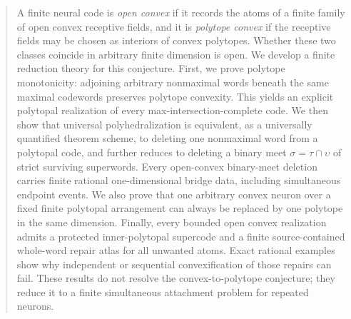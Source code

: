 \begin{abstract}
A finite neural code is \emph{open convex} if it records the atoms of a finite family of open convex receptive fields, and it is \emph{polytope convex} if the receptive fields may be chosen as interiors of convex polytopes.  Whether these two classes coincide in arbitrary finite dimension is open.  We develop a finite reduction theory for this conjecture.  First, we prove polytope monotonicity: adjoining arbitrary nonmaximal words beneath the same maximal codewords preserves polytope convexity.  This yields an explicit polytopal realization of every max-intersection-complete code.  We then show that universal polyhedralization is equivalent, as a universally quantified theorem scheme, to deleting one nonmaximal word from a polytopal code, and further reduces to deleting a binary meet $\sigma=\tau\cap\upsilon$ of strict surviving superwords.  Every open-convex binary-meet deletion carries finite rational one-dimensional bridge data, including simultaneous endpoint events.  We also prove that one arbitrary convex neuron over a fixed finite polytopal arrangement can always be replaced by one polytope in the same dimension.  Finally, every bounded open convex realization admits a protected inner-polytopal supercode and a finite source-contained whole-word repair atlas for all unwanted atoms.  Exact rational examples show why independent or sequential convexification of those repairs can fail.  These results do not resolve the convex-to-polytope conjecture; they reduce it to a finite simultaneous attachment problem for repeated neurons.
\end{abstract}
